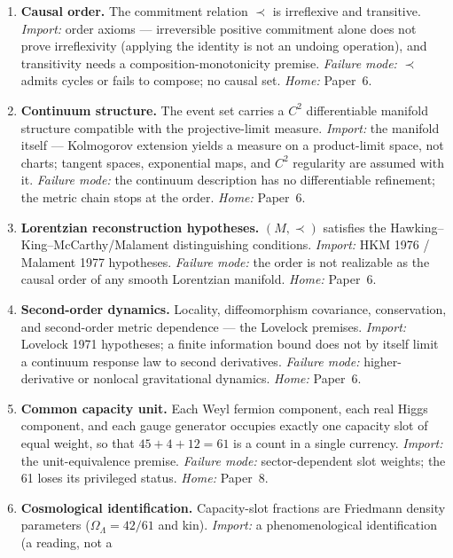 \documentclass[11pt]{article}
\theoremstyle{definition}
\begin{document}
\begin{enumerate}[label=\textbf{BA\arabic*},leftmargin=3em]
  \item \textbf{Causal order.}  The commitment relation $\prec$ is
  irreflexive and transitive.  \emph{Import:} order axioms --- irreversible
  positive commitment alone does not prove irreflexivity (applying the
  identity is not an undoing operation), and transitivity needs a
  composition-monotonicity premise.  \emph{Failure mode:} $\prec$ admits
  cycles or fails to compose; no causal set.  \emph{Home:} Paper~6.
  \item \textbf{Continuum structure.}  The event set carries a $C^2$
  differentiable manifold structure compatible with the projective-limit
  measure.  \emph{Import:} the manifold itself --- Kolmogorov extension
  yields a measure on a product-limit space, not charts; tangent spaces,
  exponential maps, and $C^2$ regularity are assumed with it.
  \emph{Failure mode:} the continuum description has no differentiable
  refinement; the metric chain stops at the order.  \emph{Home:} Paper~6.
  \item \textbf{Lorentzian reconstruction hypotheses.}  $(M, \prec)$
  satisfies the Hawking--King--McCarthy/Malament distinguishing conditions.
  \emph{Import:} HKM 1976 / Malament 1977 hypotheses.  \emph{Failure mode:}
  the order is not realizable as the causal order of any smooth Lorentzian
  manifold.  \emph{Home:} Paper~6.
  \item \textbf{Second-order dynamics.}  Locality, diffeomorphism
  covariance, conservation, and second-order metric dependence --- the
  Lovelock premises.  \emph{Import:} Lovelock 1971 hypotheses; a finite
  information bound does not by itself limit a continuum response law to
  second derivatives.  \emph{Failure mode:} higher-derivative or nonlocal
  gravitational dynamics.  \emph{Home:} Paper~6.
  \item \textbf{Common capacity unit.}  Each Weyl fermion component, each
  real Higgs component, and each gauge generator occupies exactly one
  capacity slot of equal weight, so that $45 + 4 + 12 = 61$ is a count in
  a single currency.  \emph{Import:} the unit-equivalence premise.
  \emph{Failure mode:} sector-dependent slot weights; the 61 loses its
  privileged status.  \emph{Home:} Paper~8.
  \item \textbf{Cosmological identification.}  Capacity-slot fractions are
  Friedmann density parameters ($\Omega_\Lambda = 42/61$ and kin).
  \emph{Import:} a phenomenological identification (a reading, not a

\end{enumerate}
\end{document}
